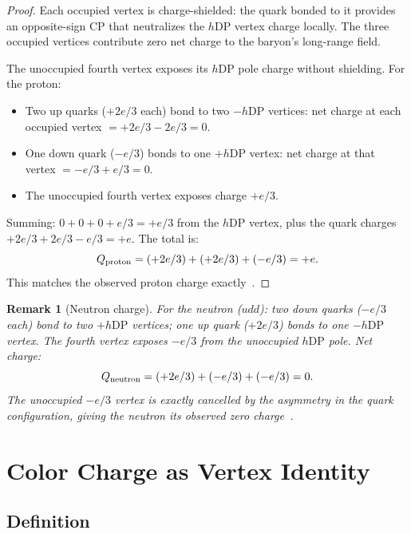 \documentclass[12pt]{article}
\newtheorem{remark}[theorem]{Remark}
\newcommand{\hDP}{h\mathrm{DP}}
\begin{document}
\begin{proof}
Each occupied vertex is charge-shielded: the quark bonded to it
provides an opposite-sign CP that neutralizes the $\hDP$ vertex
charge locally.  The three occupied vertices contribute zero net
charge to the baryon's long-range field.

The unoccupied fourth vertex exposes its $\hDP$ pole charge without
shielding.  For the proton:
\begin{itemize}[noitemsep]
\item Two up quarks ($+2e/3$ each) bond to two $-\hDP$ vertices:
  net charge at each occupied vertex $= +2e/3 - 2e/3 = 0$.
\item One down quark ($-e/3$) bonds to one $+\hDP$ vertex:
  net charge at that vertex $= -e/3 + e/3 = 0$.
\item The unoccupied fourth vertex exposes charge $+e/3$.
\end{itemize}
Summing: $0 + 0 + 0 + e/3 = +e/3$ from the $\hDP$ vertex, plus
the quark charges $+2e/3 + 2e/3 - e/3 = +e$.  The total is:
\begin{equation}
Q_{\rm proton} = (+2e/3) + (+2e/3) + (-e/3) = +e.
\label{eq:proton_charge}
\end{equation}
This matches the observed proton charge exactly~\cite{pdg2022}.
\end{proof}

\begin{remark}[Neutron charge]
For the neutron ($udd$): two down quarks ($-e/3$ each) bond to two
$+\hDP$ vertices; one up quark ($+2e/3$) bonds to one $-\hDP$
vertex.  The fourth vertex exposes $-e/3$ from the unoccupied
$\hDP$ pole.  Net charge:
\begin{equation}
Q_{\rm neutron} = (+2e/3) + (-e/3) + (-e/3) = 0.
\label{eq:neutron_charge}
\end{equation}
The unoccupied $-e/3$ vertex is exactly cancelled by the asymmetry
in the quark configuration, giving the neutron its observed zero
charge~\cite{pdg2022}.
\end{remark}

\section{Color Charge as Vertex Identity}
\label{sec:color}

\subsection{Definition}
\end{document}
